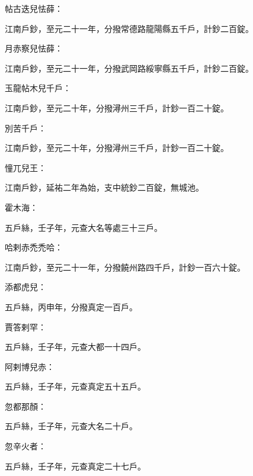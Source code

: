 \begin{pinyinscope}
 帖古迭兒怯薛：



 江南戶鈔，至元二十一年，分撥常德路龍陽縣五千戶，計鈔二百錠。



 月赤察兒怯薛：



 江南戶鈔，至元二十一年，分撥武岡路綏寧縣五千戶，計鈔二百錠。



 玉龍帖木兒千戶：



 江南戶鈔，至元二十年，分撥潯州三千戶，計鈔一百二十錠。



 別苦千戶：



 江南戶鈔，至元二十年，分撥潯州三千戶，計鈔一百二十錠。



 憧兀兒王：



 江南戶鈔，延祐二年為始，支中統鈔二百錠，無城池。



 霍木海：



 五戶絲，壬子年，元查大名等處三十三戶。



 哈剌赤禿禿哈：



 江南戶鈔，至元二十一年，分撥饒州路四千戶，計鈔一百六十錠。



 添都虎兒：



 五戶絲，丙申年，分撥真定一百戶。



 賈答剌罕：



 五戶絲，壬子年，元查大都一十四戶。



 阿剌博兒赤：



 五戶絲，壬子年，元查真定五十五戶。



 忽都那顏：



 五戶絲，壬子年，元查大名二十戶。



 忽辛火者：



 五戶絲，壬子年，元查真定二十七戶。




\end{pinyinscope}
